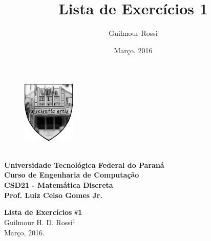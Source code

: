 \documentclass[12pt, a4paper]{article}
\title{Lista de Exercícios 1}
\author{Guilmour Rossi}
\date{Março, 2016}
\begin{document}
     

\begin{minipage}{20cm}
\begin{figure}
\includegraphics[width=2.5cm]{ex_scientia_artis.png}  
\end{figure}

\textbf{\\Universidade Tecnológica Federal do Paraná\\
	Curso de Engenharia de Computação\\
    CSD21 - Matemática Discreta \\
    Prof. Luiz Celso Gomes Jr.      \\}

\end{minipage}


	\vskip15mm
	    
    
       \begin{flushright}
       
      

        \textbf{Lista de Exercícios} \texttt{\#}\textbf{1} 
		{\\Guilmour H. D. Rossi\texttt{$^1$} \\}
        {Março, 2016.\\}		        
   \end{flushright}  
   
\end{document}
